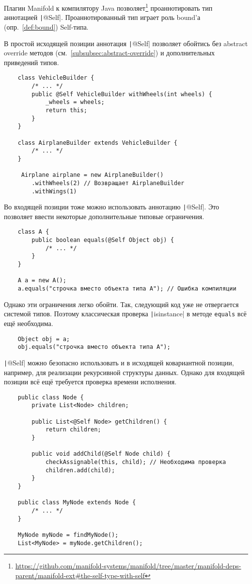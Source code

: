 Плагин Manifold к компилятору Java позволяет\footnote{\url{https://github.com/manifold-systems/manifold/tree/master/manifold-deps-parent/manifold-ext\#the-self-type-with-self}} проаннотировать тип аннотацией \texttt|@Self|.
Проаннотированный тип играет роль bound'а (опр.~\ref{def:bound}) Self-типа.

В простой исходящей позиции аннотация \texttt|@Self| позволяет обойтись без abstract override методов (см.~\ref{subsubsec:abstract-override}) и дополнительных приведений типов.

\begin{verbatim}
    class VehicleBuilder {
        /* ... */
        public @Self VehicleBuilder withWheels(int wheels) {
            _wheels = wheels;
            return this;
        }
    }

    class AirplaneBuilder extends VehicleBuilder {
        /* ... */
    }

     Airplane airplane = new AirplaneBuilder()
        .withWheels(2) // Возвращает AirplaneBuilder
        .withWings(1)
\end{verbatim}

Во входящей позиции тоже можно использовать аннотацию \texttt|@Self|.
Это позволяет ввести некоторые дополнительные типовые ограничения.

\begin{verbatim}
    class A {
        public boolean equals(@Self Object obj) {
            /* ... */
        }
    }

    A a = new A();
    a.equals("строчка вместо объекта типа A"); // Ошибка компиляции
\end{verbatim}

Однако эти ограничения легко обойти.
Так, следующий код уже не отвергается системой типов.
Поэтому классическая проверка \texttt|isinstance| в методе \texttt{equals} всё ещё необходима.

\begin{verbatim}
    Object obj = a;
    obj.equals("строчка вместо объекта типа A");
\end{verbatim}

\texttt|@Self| можно безопасно использовать и в исходящей ковариантной позиции, например, для реализации рекурсивной структуры данных.
Однако для входящей позиции всё ещё требуется проверка времени исполнения.

\begin{verbatim}
    public class Node {
        private List<Node> children;

        public List<@Self Node> getChildren() {
            return children;
        }

        public void addChild(@Self Node child) {
            checkAssignable(this, child); // Необходима проверка
            children.add(child);
        }
    }

    public class MyNode extends Node {
        /* ... */
    }

    MyNode myNode = findMyNode();
    List<MyNode> = myNode.getChildren();
\end{verbatim}

